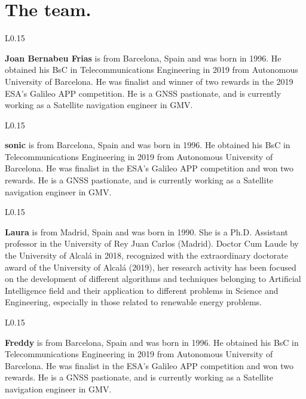
\section{The team.}
\begin{wrapfigure}{L}{0.15\textwidth}
    \end{wrapfigure}
\textbf{Joan Bernabeu Frias} is from Barcelona, Spain and was born in 1996. He obtained his BsC in Telecommunications Engineering in 2019 from Autonomous University of Barcelona. He was finalist and winner of two rewards in the 2019 ESA's Galileo APP competition. He is a GNSS pastionate, and is currently working as a Satellite navigation engineer in GMV.\\

\begin{wrapfigure}{L}{0.15\textwidth}
    \end{wrapfigure}
\textbf{sonic} is from Barcelona, Spain and was born in 1996. He obtained his BsC in Telecommunications Engineering in 2019 from Autonomous University of Barcelona. He was finalist in the ESA's Galileo APP competition and won two rewards. He is a GNSS pastionate, and is currently working as a Satellite navigation engineer in GMV.\\

\begin{wrapfigure}{L}{0.15\textwidth}
    \end{wrapfigure}
\textbf{Laura} is from Madrid, Spain and was born in 1990. She is a Ph.D. Assistant professor in the University of Rey Juan Carlos (Madrid). Doctor Cum Laude by the University of Alcalá in 2018, recognized with the extraordinary doctorate award of the University of Alcalá (2019), her research activity has been focused on the development of different algorithms and techniques belonging to Artificial Intelligence field and their application to different problems in Science and Engineering, especially in those related to renewable energy problems. \\

\begin{wrapfigure}{L}{0.15\textwidth}
    \end{wrapfigure}
\textbf{Freddy} is from Barcelona, Spain and was born in 1996. He obtained his BsC in Telecommunications Engineering in 2019 from Autonomous University of Barcelona. He was finalist in the ESA's Galileo APP competition and won two rewards. He is a GNSS pastionate, and is currently working as a Satellite navigation engineer in GMV.\\

